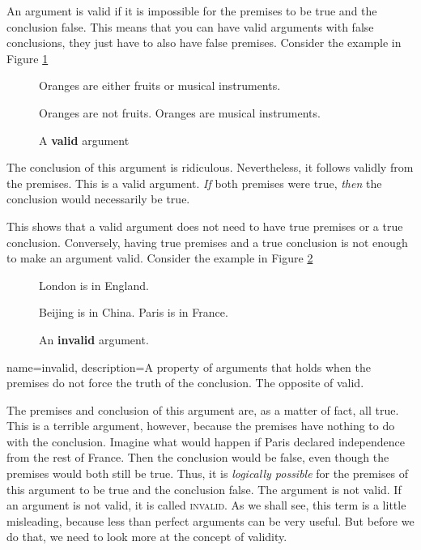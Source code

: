 An argument is valid if it is impossible for the premises to be true and the conclusion false. This means that you can have valid arguments with false conclusions, they just have to also have false premises. Consider the example in Figure \ref{fig:valid_oranges}


\begin{figure}[t]
\begin{mdframed}[style=mytablebox]
\begin{earg*}
\item Oranges are either fruits or musical instruments.
\item Oranges are not fruits.
\itemc Oranges are musical instruments.
\end{earg*}
\end{mdframed}
\caption{A \textbf{valid} argument} \label{fig:valid_oranges}
\end{figure}

\label{valid_arg_false_premises}

The conclusion of this argument is ridiculous. Nevertheless, it follows validly from the premises. This is a valid argument. \emph{If} both premises were true, \emph{then} the conclusion would necessarily be true.

This shows that a valid argument does not need to have true premises or a true conclusion. Conversely, having true premises and a true conclusion is not enough to make an argument valid. Consider the example in Figure \ref{fig:invalid_paris}


\begin{figure}[b]
\begin{mdframed}[style=mytablebox]
\begin{earg*}
\item London is in England.
\item Beijing is in China.
\itemc[.3] Paris is in France.
\end{earg*}
\end{mdframed}
\caption{An \textbf{invalid} argument.} \label{fig:invalid_paris}
\end{figure}
\label{invalid_true_premises_and_conclusion}


{
name=invalid,
description={A property of arguments that holds when the premises do not force the truth of the conclusion. The opposite of valid.}
}
 

The premises and conclusion of this argument are, as a matter of fact, all true. This is a terrible argument, however, because the premises have nothing to do with the conclusion. Imagine what would happen if Paris declared independence from the rest of France. Then the conclusion would be false, even though the premises would both still be true. Thus, it is \emph{logically possible} for the premises of this argument to be true and the conclusion false. The argument is not valid.  If an argument is not valid, it is called \textsc{\gls{invalid}}. \label{def:invalid} As we shall see, this term is a little misleading, because less than perfect arguments can be very useful. But before we do that, we need to look more at the concept of validity.

